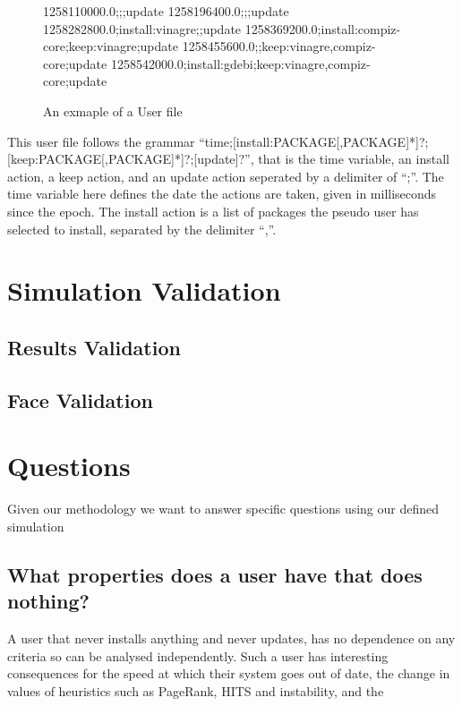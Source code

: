 \begin{figure}[htp]
\begin{center}
1258110000.0;;;update
1258196400.0;;;update
1258282800.0;install:vinagre;;update
1258369200.0;install:compiz-core;keep:vinagre;update
1258455600.0;;keep:vinagre,compiz-core;update
1258542000.0;install:gdebi;keep:vinagre,compiz-core;update
  \caption[User File example]{An exmaple of a User file}
  \label{userfile}
\end{center}
\end{figure}

This user file follows the grammar ``time;[install:PACKAGE[,PACKAGE]*]?;[keep:PACKAGE[,PACKAGE]*]?;[update]?'',
that is the time variable, an install action, a keep action, and an update action seperated by a delimiter of ``;''.
The time variable here defines the date the actions are taken, given in milliseconds since the epoch.
The install action is a list of packages the pseudo user has selected to install, separated by the delimiter ``,''. 


\section{Simulation Validation}

\subsection{Results Validation}

\subsection{Face Validation}


\section{Questions}
Given our methodology we want to answer specific questions using our defined simulation

\subsection{What properties does a user have that does nothing?}
{}A user that never installs anything and never updates, has no dependence on any criteria so can be analysed independently.
{}Such a user has interesting consequences for the speed at which their system goes out of date, the change in values of heuristics such as PageRank, HITS and instability,
{}and the 

